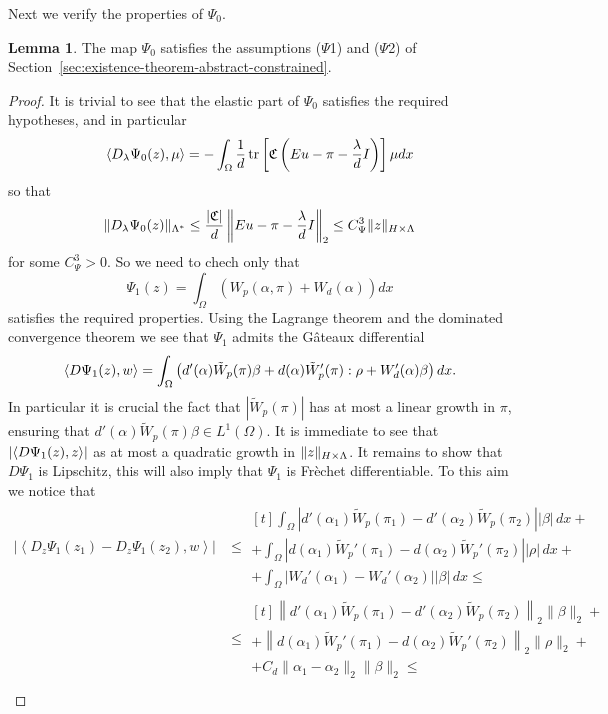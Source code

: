 \documentclass[a4paper,10pt,oneside]{amsbook}
\numberwithin{section}{chapter}
\numberwithin{equation}{chapter}
\theoremstyle{definition}
\newtheorem{lemma}[prop]{Lemma}
\DeclareMathOperator{\tr}{tr}
\DeclarePairedDelimiter{\norm}{\lVert}{\rVert}
\DeclarePairedDelimiter{\dual}{\langle}{\rangle}
\begin{document}
Next we verify the properties of $\Psi_0$.
\begin{lemma}
The map $\Psi_0$ satisfies the assumptions ($\Psi$1) and ($\Psi$2) of Section~\ref{sec:existence-theorem-abstract-constrained}.
\end{lemma}
\begin{proof}
It is trivial to see that the elastic part of $\Psi_0$ satisfies the required hypotheses, and in particular
\[
\dual{D_\lambda\Psi_0(z),\mu}=-\int_\Omega\frac{1}{d}\tr\left[\mathfrak{C}\left(Eu-\pi-\frac{\lambda}{d}I\right)\right]\mu dx
\]
so that
\[
\norm{D_\lambda\Psi_0(z)}_{\Lambda^*}\le\frac{|\mathfrak{C}|}{d}\left\|Eu-\pi-\frac{\lambda}{d}I\right\|_2\le C_\Psi^3\norm{z}_{H\times\Lambda}
\]
for some $C_\Psi^3>0$. So we need to chech only that
\[
\Psi_1(z)=\int_\Omega\left(W_p(\alpha,\pi)+W_d(\alpha)\right)dx
\]
satisfies the required properties. Using the Lagrange theorem and the dominated convergence theorem we see that $\Psi_1$ admits the G\^ateaux differential
\[
\dual{D\Psi_1(z),w}=\int_\Omega\left(d'(\alpha)\tilde W_p(\pi)\beta+d(\alpha)\tilde W_p'(\pi):\rho+W_d'(\alpha)\beta\right)dx.
\]
In particular it is crucial the fact that $|\tilde W_p(\pi)|$ has at most a linear growth in $\pi$, ensuring that $d'(\alpha)\tilde W_p(\pi)\beta\in L^1(\Omega)$. It is immediate to see that $|\dual{D\Psi_1(z),z}|$ as at most a quadratic growth in $\norm{z}_{H\times\Lambda}$. It remains to show that $D\Psi_1$ is Lipschitz, this will also imply that $\Psi_1$ is Frèchet differentiable. To this aim we notice that
\[
\begin{split}
\left|\left\langle D_z\Psi_1(z_1)-D_z\Psi_1(z_2),w\right\rangle\right|&\le
\begin{multlined}[t]
\int_{\Omega}\left|d'(\alpha_1)\tilde W_p(\pi_1)-d'(\alpha_2)\tilde W_p(\pi_2)\right||\beta|\,dx+\\
+\int_{\Omega}\left|d(\alpha_1)\tilde W_p'(\pi_1)-d(\alpha_2)\tilde W_p'(\pi_2)\right||\rho|\,dx+\\
+\int_{\Omega}\left|W_d'(\alpha_1)-W_d'(\alpha_2)\right||\beta|\,dx\le
\end{multlined}\\
&\le
\begin{multlined}[t]
\left\|d'(\alpha_1)\tilde W_p(\pi_1)-d'(\alpha_2)\tilde W_p(\pi_2)\right\|_2\|\beta\|_2+\\
+\left\|d(\alpha_1)\tilde W_p'(\pi_1)-d(\alpha_2)\tilde W_p'(\pi_2)\right\|_2\|\rho\|_2+\\
+C_d\|\alpha_1-\alpha_2\|_2\|\beta\|_2\le
\end{multlined}\\

\end{split}\]
\end{proof}
\end{document}
